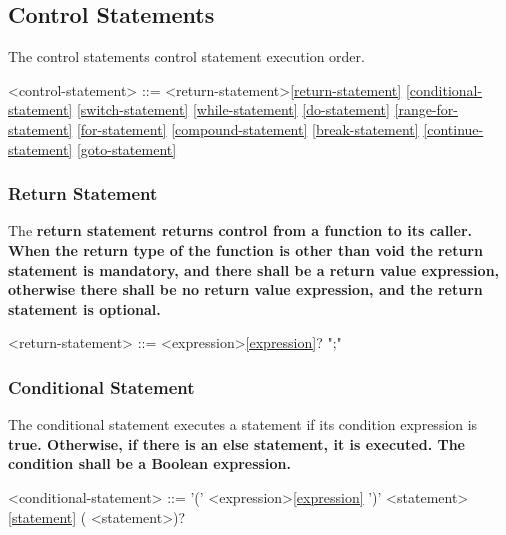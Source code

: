 \documentclass[a4paper,oneside,11pt]{article}
\begin{document}
\subsection{Control Statements}

The control statements control statement execution order.

\begin{grammar}
\label{control-statement}<control-statement> ::= <return-statement>\ref{return-statement}
\ref{conditional-statement}
\ref{switch-statement}
\ref{while-statement}
\ref{do-statement}
\ref{range-for-statement}
\ref{for-statement}
\ref{compound-statement}
\ref{break-statement}
\ref{continue-statement}
\ref{goto-statement}
\end{grammar}

\subsubsection{Return Statement}

The \bf{return} statement returns control from a function to its caller.
When the return type of the function is other than \bf{void}
the return statement is mandatory, and
there shall be a return value expression,
otherwise there shall be no return value expression,
and the return statement is optional.

\begin{grammar}
\label{return-statement}<return-statement> ::=  <expression>\ref{expression}? ";"
\end{grammar}

\subsubsection{Conditional Statement}

The conditional statement executes a statement if its condition expression is \bf{true}.
Otherwise, if there is an else statement, it is executed.
The condition shall be a Boolean expression.

\begin{grammar}
\label{conditional-statement}<conditional-statement> ::=  '(' <expression>\ref{expression} ')' <statement>\ref{statement} ( <statement>)?
\end{grammar}
\end{document}
